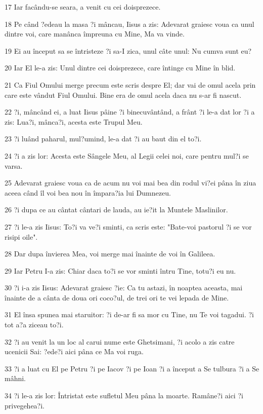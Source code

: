 \par 17 Iar facându-se seara, a venit cu cei doisprezece.
\par 18 Pe când ?edeau la masa ?i mâncau, Iisus a zis: Adevarat graiesc voua ca unul dintre voi, care manânca împreuna cu Mine, Ma va vinde.
\par 19 Ei au început sa se întristeze ?i sa-I zica, unul câte unul: Nu cumva sunt eu?
\par 20 Iar El le-a zis: Unul dintre cei doisprezece, care întinge cu Mine în blid.
\par 21 Ca Fiul Omului merge precum este scris despre El; dar vai de omul acela prin care este vândut Fiul Omului. Bine era de omul acela daca nu s-ar fi nascut.
\par 22 ?i, mâncând ei, a luat Iisus pâine ?i binecuvântând, a frânt ?i le-a dat lor ?i a zis: Lua?i, mânca?i, acesta este Trupul Meu.
\par 23 ?i luând paharul, mul?umind, le-a dat ?i au baut din el to?i.
\par 24 ?i a zis lor: Acesta este Sângele Meu, al Legii celei noi, care pentru mul?i se varsa.
\par 25 Adevarat graiesc voua ca de acum nu voi mai bea din rodul vi?ei pâna în ziua aceea când îl voi bea nou în împara?ia lui Dumnezeu.
\par 26 ?i dupa ce au cântat cântari de lauda, au ie?it la Muntele Maslinilor.
\par 27 ?i le-a zis Iisus: To?i va ve?i sminti, ca scris este: "Bate-voi pastorul ?i se vor risipi oile".
\par 28 Dar dupa învierea Mea, voi merge mai înainte de voi în Galileea.
\par 29 Iar Petru I-a zis: Chiar daca to?i se vor sminti întru Tine, totu?i eu nu.
\par 30 ?i i-a zis Iisus: Adevarat graiesc ?ie: Ca tu astazi, în noaptea aceasta, mai înainte de a cânta de doua ori coco?ul, de trei ori te vei lepada de Mine.
\par 31 El însa spunea mai staruitor: ?i de-ar fi sa mor cu Tine, nu Te voi tagadui. ?i tot a?a ziceau to?i.
\par 32 ?i au venit la un loc al carui nume este Ghetsimani, ?i acolo a zis catre ucenicii Sai: ?ede?i aici pâna ce Ma voi ruga.
\par 33 ?i a luat cu El pe Petru ?i pe Iacov ?i pe Ioan ?i a început a Se tulbura ?i a Se mâhni.
\par 34 ?i le-a zis lor: Întristat este sufletul Meu pâna la moarte. Ramâne?i aici ?i privegehea?i.
